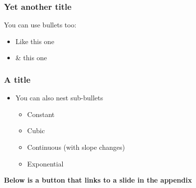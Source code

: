 \documentclass[
    11pt, %
    aspectratio=169, %
]{beamer}
\begin{document}

\begin{frame}
	\frametitle{Yet another title}
            You can use bullets too:\newline
            \begin{itemize}
                \item Like this one\newline
                \item \& this one
            \end{itemize}
\end{frame}

\begin{frame}
\label{Test} %
	\frametitle{A title}

        \begin{itemize}
            \item You can also nest sub-bullets
            \begin{itemize}
                \item Constant
                \item Cubic
                \item Continuous (with slope changes)
                \item Exponential \newline
            \end{itemize}
        \end{itemize}

        \textbf{Below is a button that links to a slide in the appendix}
        
        \begin{center}
            \hyperlink{Figure}{}    
        \end{center}
\end{frame}
\end{document}
